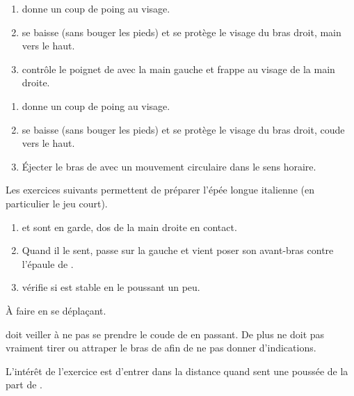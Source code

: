 \begin{exercice}
\label{mains-nues:ex:enzi-3}

\begin{enumerate}
	\item \A donne un coup de poing au visage.
	\item \D se baisse (sans bouger les pieds) et se protège le visage du bras droit, main vers le haut.
	\item \D contrôle le poignet de \A avec la main gauche et frappe au visage de la main droite.
\end{enumerate}

\end{exercice}


\begin{exercice}
\label{mains-nues:ex:enzi-4}

\begin{enumerate}
	\item \A donne un coup de poing au visage.
	\item \D se baisse (sans bouger les pieds) et se protège le visage du bras droit, coude vers le haut.
	\item Éjecter le bras de \A avec un mouvement circulaire dans le sens horaire.
\end{enumerate}

\end{exercice}
\bigskip

Les exercices suivants permettent de préparer l'épée longue italienne (en particulier le jeu court).


\begin{exercice}

\begin{enumerate}
	\item \A et \D sont en garde, dos de la main droite en contact.
	
	\item Quand il le sent, \A passe sur la gauche et vient poser son avant-bras contre l'épaule de \D.
	
	\item \D vérifie si \A est stable en le poussant un peu.
\end{enumerate}

À faire en se déplaçant.

\A doit veiller à ne pas se prendre le coude de \D en passant.
De plus \A ne doit pas vraiment tirer ou attraper le bras de \D afin de ne pas donner d'indications.

L'intérêt de l'exercice est d'entrer dans la distance quand \A sent une poussée de la part de \D.

\end{exercice}


